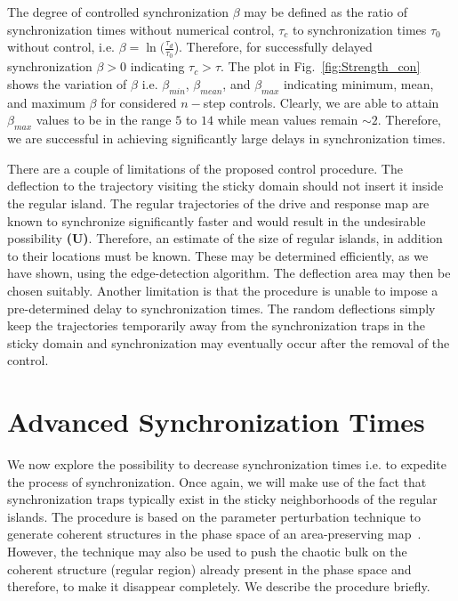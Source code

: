 \documentclass[reprint,amsmath,amssymb,aps,pre]{revtex4-1}
\begin{document}
The degree of controlled synchronization $\beta$ may be defined as the ratio 
of synchronization times without numerical control, $\tau_c$ to 
synchronization times $\tau_0$ without control, i.e. $\beta =  
\ln(\frac{\tau_d}{\tau_0}$).  Therefore, for successfully delayed 
synchronization $\beta>0$ indicating $\tau_c > \tau$. The plot in 
Fig.~\ref{fig:Strength_con} shows the variation of $\beta$ i.e. $\beta_{min}$, 
$\beta_{mean}$, and $\beta_{max}$  indicating minimum, mean, and maximum 
$\beta$ for considered $n-$step controls. Clearly, we are able to attain 
$\beta_{max}$ values to be in the range $5$ to $14$ while mean values remain 
$\sim2$. Therefore, we are successful in achieving 
significantly large delays in synchronization times. 


There are a couple of limitations of the proposed control procedure. The deflection to the trajectory visiting the sticky domain should not insert it inside the regular island. The regular trajectories of the drive and response map are known to synchronize significantly faster and would result in the undesirable possibility \textbf{(U)}. Therefore, an estimate of the size of regular islands, in addition to their locations must be known. These may be determined efficiently, as we have shown, using the edge-detection algorithm. The deflection area  may then be chosen suitably.  Another limitation is that the procedure is unable to impose a pre-determined delay to synchronization times. The random deflections simply keep the trajectories temporarily away from the synchronization traps in the sticky domain and synchronization may eventually occur after the removal of the control. 


\section{Advanced Synchronization Times}
\label{sec:advanced}
We now explore the possibility to decrease synchronization times 
i.e. to expedite the process of synchronization. Once again, we will make use 
of the fact that synchronization traps typically exist in the sticky 
neighborhoods of the regular islands.  The procedure is based on the parameter 
perturbation technique to generate coherent structures in the phase space of 
an area-preserving map~\cite{Gupte2007}. However, the technique may also be 
used to push the 
chaotic bulk on the coherent structure (regular region) already present in the 
phase space and therefore, to make it disappear completely.  We describe the 
procedure briefly. 
\end{document}

